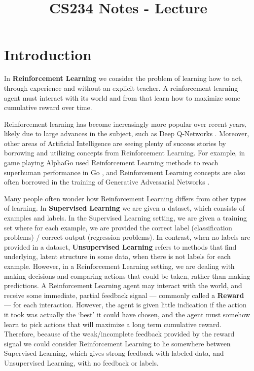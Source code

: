 \documentclass{article}
\title{CS234 Notes - Lecture \lecturenum \\ \lecturetitle }
\author{ \lecturescribe }
\begin{document}
\maketitle

\section{Introduction}
In \textbf{Reinforcement Learning} we consider the problem of learning how to act, through experience and without an explicit teacher. A reinforcement learning agent must interact with its world and from that learn how to maximize some cumulative reward over time. 

Reinforcement learning has become increasingly more popular over recent years, likely due to large advances in the subject, such as Deep Q-Networks \cite{DQN}. Moreover, other areas of Artificial Intelligence are seeing plenty of success stories by borrowing and utilizing concepts from Reinforcement Learning. For example, in game playing AlphaGo used Reinforcement Learning methods to reach superhuman performance in Go \cite{AlphaGo}, and Reinforcement Learning concepts are also often borrowed in the training of Generative Adversarial Networks \cite{GANtrainingtricks}.

Many people often wonder how Reinforcement Learning differs from other types of learning. In \textbf{Supervised Learning} we are given a dataset, which consists of examples and labels. In the Supervised Learning  setting, we are given a training set where for each example, we are provided the correct label (classification problems) / correct output (regression problems). In contrast, when no labels are provided in a dataset, \textbf{Unsupervised Learning} refers to methods that find underlying, latent structure in some data, when there is not labels for each example. However, in a Reinforcement Learning setting, we are dealing with making decisions and comparing actions that could be taken, rather than making predictions. A Reinforcement Learning agent may interact with the world, and receive some immediate, partial feedback signal --- commonly called a \textbf{Reward} --- for each interaction. However, the agent is given little indication if the action it took was actually the `best' it could have chosen, and the agent must somehow learn to pick actions that will maximize a long term cumulative reward. Therefore, because of the weak/incomplete feedback provided by the reward signal we could consider Reinforcement Learning to lie somewhere between Supervised Learning, which gives strong feedback with labeled data, and Unsupervised Learning, with no feedback or labels.
\end{document}
